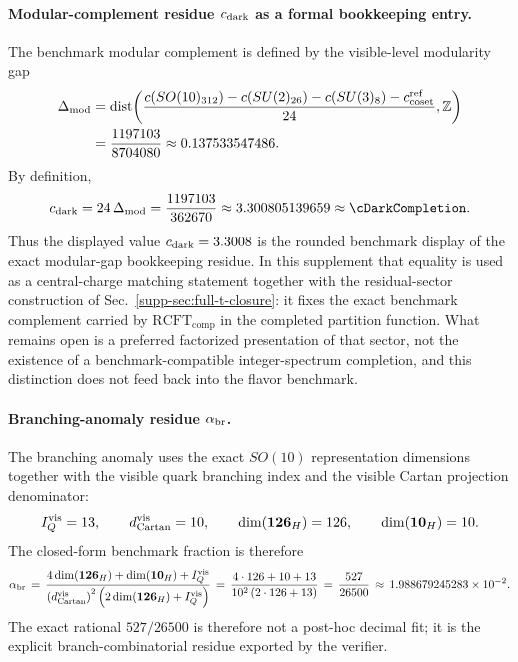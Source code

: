 \documentclass[11pt]{article}
\begin{document}
\paragraph{Modular-complement residue $c_{\rm dark}$ as a formal bookkeeping entry.}
The benchmark modular complement is defined by the visible-level modularity gap
\begin{equation}
\begin{aligned}
 \Delta_{\rm mod}
 &= \operatorname{dist}\!\left(
 \frac{c\!\left(SO(10)_{312}\right)-c\!\left(SU(2)_{26}\right)-c\!\left(SU(3)_8\right)-c_{\rm coset}^{\rm ref}}{24},
 \mathbb Z
 \right) \\
 &= \frac{1197103}{8704080}
 \approx 0.137533547486.
\end{aligned}
\end{equation}
By definition,
\begin{equation}
 c_{\rm dark}=24\,\Delta_{\rm mod}=\frac{1197103}{362670}\approx 3.300805139659\approx\cDarkCompletion.
\end{equation}
Thus the displayed value $c_{\rm dark}=3.3008$ is the rounded benchmark display of the exact modular-gap bookkeeping residue. In this supplement that equality is used as a central-charge matching statement together with the residual-sector construction of Sec.~\ref{supp-sec:full-t-closure}: it fixes the exact benchmark complement carried by $\mathrm{RCFT}_{\mathrm{comp}}$ in the completed partition function. What remains open is a preferred factorized presentation of that sector, not the existence of a benchmark-compatible integer-spectrum completion, and this distinction does not feed back into the flavor benchmark.

\paragraph{Branching-anomaly residue $\alpha_{\rm br}$.}
The branching anomaly uses the exact $SO(10)$ representation dimensions together with the visible quark branching index and the visible Cartan projection denominator:
\begin{equation}
 I_Q^{\rm vis}=13,
 \qquad
 d_{\rm Cartan}^{\rm vis}=10,
 \qquad
 \dim(\mathbf{126}_H)=126,
 \qquad
 \dim(\mathbf{10}_H)=10.
\end{equation}
The closed-form benchmark fraction is therefore
\begin{equation}
 \alpha_{\rm br}
 \,=\,
 \frac{4\dim(\mathbf{126}_H)+\dim(\mathbf{10}_H)+I_Q^{\rm vis}}{\left(d_{\rm Cartan}^{\rm vis}\right)^2\left(2\dim(\mathbf{126}_H)+I_Q^{\rm vis}\right)}
 \,=\,
 \frac{4\cdot126+10+13}{10^2\left(2\cdot126+13\right)}
 \,=\,
 \frac{527}{26500}
 \,\approx\,
 1.988679245283\times10^{-2}.
\end{equation}
The exact rational $527/26500$ is therefore not a post-hoc decimal fit; it is the explicit branch-combinatorial residue exported by the verifier.
\end{document}
